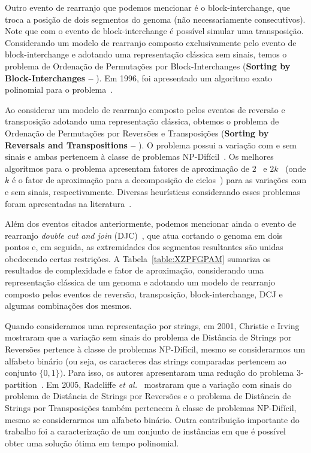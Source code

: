 Outro evento de rearranjo que podemos mencionar é o block-interchange, que troca a posição de dois segmentos do genoma (não necessariamente consecutivos). Note que com o evento de block-interchange é possível simular uma transposição. Considerando um modelo de rearranjo composto exclusivamente pelo evento de block-interchange e adotando uma representação clássica sem sinais, temos o problema de Ordenação de Permutações por Block-Interchanges (\textbf{Sorting by Block-Interchanges --} \SbBI). Em 1996, foi apresentado um algoritmo exato polinomial para o problema~\cite{1996-christie}.

Ao considerar um modelo de rearranjo composto pelos eventos de reversão e transposição adotando uma representação clássica, obtemos o problema de Ordenação de Permutações por Reversões e Transposições (\textbf{Sorting by Reversals and Transpositions --} \SbRT). O problema possui a variação com e sem sinais e ambas pertencem à classe de problemas NP-Difícil~\cite{2019b-oliveira-etal}. Os melhores algoritmos para o problema apresentam fatores de aproximação de $2$~\cite{1998-walter-etal} e $2k$~\cite{2008-rahman-etal} (onde $k$ é o fator de aproximação para a decomposição de ciclos~\cite{2013-chen}) para as variações com e sem sinais, respectivamente. Diversas heurísticas considerando esses problemas foram apresentadas na literatura~\cite{2014a-dias-etal,2018-brito-etal}.

Além dos eventos citados anteriormente, podemos mencionar ainda o evento de rearranjo \emph{double cut and join} (DJC)~\cite{2005-yancopoulos-etal}, que atua cortando o genoma em dois pontos e, em seguida, as extremidades dos segmentos resultantes são unidas obedecendo certas restrições. A Tabela~\ref{table:XZPFGPAM} sumariza os resultados de complexidade e fator de aproximação, considerando uma representação clássica de um genoma e adotando um modelo de rearranjo composto pelos eventos de reversão, transposição, block-interchange, DCJ e algumas combinações dos mesmos. 



Quando consideramos uma representação por strings, em 2001, Christie e Irving~\cite{2001-christie-irving} mostraram que a variação sem sinais do problema de Distância de Strings por Reversões pertence à classe de problemas NP-Difícil, mesmo se considerarmos um alfabeto binário (ou seja, os caracteres das strings comparadas pertencem ao conjunto $\{0,1\})$. Para isso, os autores apresentaram uma redução do problema 3-partition~\cite{1990-garey-johnson}. Em 2005, Radcliffe \textit{et al.}~\cite{2005-radcliffe-etal} mostraram que a variação com sinais do problema de Distância de Strings por Reversões e o problema de Distância de Strings por Transposições também pertencem à classe de problemas NP-Difícil, mesmo se considerarmos um alfabeto binário. Outra contribuição importante do trabalho foi a caracterização de um conjunto de instâncias em que é possível obter uma solução ótima em tempo polinomial.

